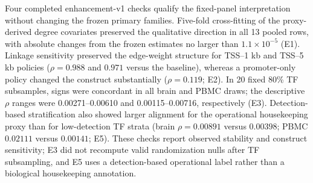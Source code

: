 \documentclass[fleqn,10pt,lineno]{wlpeerj}
\begin{document}
Four completed enhancement-v1 checks qualify the fixed-panel interpretation without changing the
frozen primary families. Five-fold cross-fitting of the proxy-derived degree covariates preserved the
qualitative direction in all 13 pooled rows, with absolute changes from the frozen estimates no larger
than $1.1\times10^{-5}$ (E1). Linkage sensitivity preserved the edge-weight structure for TSS--1 kb
and TSS--5 kb policies ($\rho=0.988$ and $0.971$ versus the baseline), whereas a promoter-only policy
changed the construct substantially ($\rho=0.119$; E2). In 20 fixed 80\% TF subsamples, signs were
concordant in all brain and PBMC draws; the descriptive $\rho$ ranges were 0.00271--0.00610 and
0.00115--0.00716, respectively (E3). Detection-based stratification also showed larger alignment for
the operational housekeeping proxy than for low-detection TF strata (brain $\rho=0.00891$ versus
$0.00398$; PBMC $0.02111$ versus $0.00141$; E5). These checks report observed stability and
construct sensitivity; E3 did not recompute valid randomization nulls after TF subsampling, and E5
uses a detection-based operational label rather than a biological housekeeping annotation.
\end{document}
